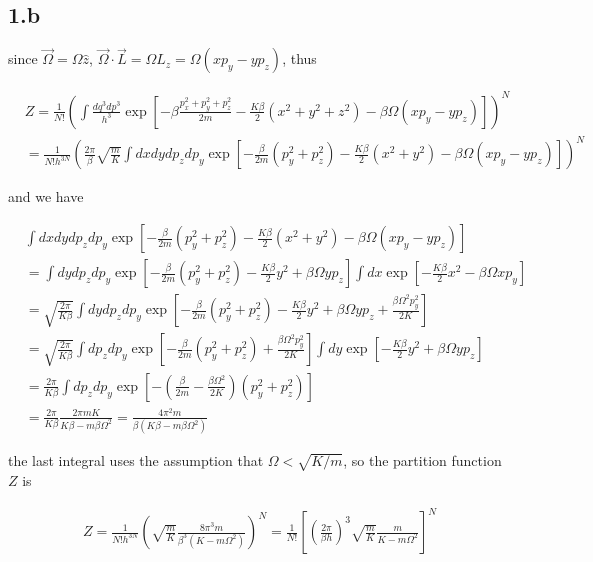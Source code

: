 \documentclass{article}
\begin{document}
\subsection*{1.b}

since $\vec{\Omega} = \Omega \hat{z}$, $\vec{\Omega}\cdot \vec{L} = \Omega L_z = \Omega (xp_y - yp_z)$, thus

$$
\begin{aligned}
    & Z = \frac{1}{N!}(\int \frac{dq^3 dp^3}{h^3} \exp[-\beta\frac{p_x^2 + p_y^2 + p_z^2}{2m} - \frac{K\beta}{2}(x^2 + y^2 + z^2) - \beta \Omega (xp_y - yp_z)])^N\\
    &= \frac{1}{N!h^{3N}} (\frac{2\pi}{\beta}\sqrt{\frac{m}{K}}\int dx dy dp_z dp_y \exp[-\frac{\beta}{2m}(p_y^2 + p_z^2) - \frac{K\beta}{2} (x^2 + y^2) - \beta \Omega (xp_y - yp_z) ])^N
\end{aligned}
$$

and we have

$$
\begin{aligned}
    &\int dx dy dp_z dp_y \exp[-\frac{\beta}{2m}(p_y^2 + p_z^2) - \frac{K\beta}{2} (x^2 + y^2) - \beta \Omega (xp_y - yp_z) ]\\
    &=\int dy dp_z dp_y \exp[-\frac{\beta}{2m}(p_y^2 + p_z^2) - \frac{K\beta}{2} y^2 + \beta \Omega yp_z] \int dx \exp[- \frac{K\beta}{2} x^2 - \beta \Omega xp_y]\\
    &= \sqrt{\frac{2\pi}{K\beta}}\int dy dp_z dp_y \exp[-\frac{\beta}{2m}(p_y^2 + p_z^2) - \frac{K\beta}{2} y^2 + \beta \Omega yp_z + \frac{\beta \Omega^2 p_y^2}{2K}]\\
    &= \sqrt{\frac{2\pi}{K\beta}}\int dp_z dp_y \exp[-\frac{\beta}{2m}(p_y^2 + p_z^2) + \frac{\beta \Omega^2 p_y^2}{2K}] \int dy \exp[- \frac{K\beta}{2} y^2 + \beta \Omega yp_z]\\
    &= \frac{2\pi}{K\beta}\int dp_z dp_y \exp[-(\frac{\beta}{2m} - \frac{\beta \Omega^2}{2K})(p_y^2 + p_z^2)]\\
    &= \frac{2\pi}{K\beta} \frac{2\pi m K}{K\beta - m\beta \Omega^2} = \frac{4\pi^2 m}{\beta (K\beta - m\beta \Omega^2)}
\end{aligned}
$$

the last integral uses the assumption that $\Omega < \sqrt{K/m}$, so the partition function $Z$ is

$$
\begin{aligned}
    Z = \frac{1}{N!h^{3N}}(\sqrt{\frac{m}{K}} \frac{8\pi^3 m}{\beta^3 (K - m \Omega^2)})^N = \frac{1}{N!}[(\frac{2\pi}{\beta h})^3\sqrt{\frac{m}{K}} \frac{m}{K - m \Omega^2}]^N
\end{aligned}
$$
\end{document}
